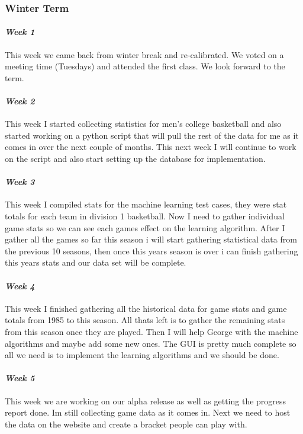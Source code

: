 \documentclass[onecolumn, draftclsnofoot,10pt, compsoc]{IEEEtran}
\begin{document}
\subsubsection{Winter Term}
\paragraph{\emph{Week 1}}
This week we came back from winter break and re-calibrated. We voted on a meeting time (Tuesdays) and attended the first class. We look forward to the term.
\paragraph{\emph{Week 2}}
This week I started collecting statistics for men's college basketball and also started working on a python script that will pull the rest of the data for me as it comes in over the next couple of months. This next week I will continue to work on the script and also start setting up the database for implementation.
\paragraph{\emph{Week 3}}
This week I compiled stats for the machine learning test cases, they were stat totals for each team in division 1 basketball. Now I need to gather individual game stats so we can see each games effect on the learning algorithm. After I gather all the games so far this season i will start gathering statistical data from the previous 10 seasons, then once this years season is over i can finish gathering this years stats and our data set will be complete.
\paragraph{\emph{Week 4}}
This week I finished gathering all the historical data for game stats and game totals from 1985 to this season. All thats left is to gather the remaining stats from this season once they are played. Then I will help George with the machine algorithms and maybe add some new ones. The GUI is pretty much complete so all we need is to implement the learning algorithms and we should be done.
\paragraph{\emph{Week 5}}
This week we are working on our alpha release as well as getting the progress report done. Im still collecting game data as it comes in. Next we need to host the data on the website and create a bracket people can play with.
\end{document}
